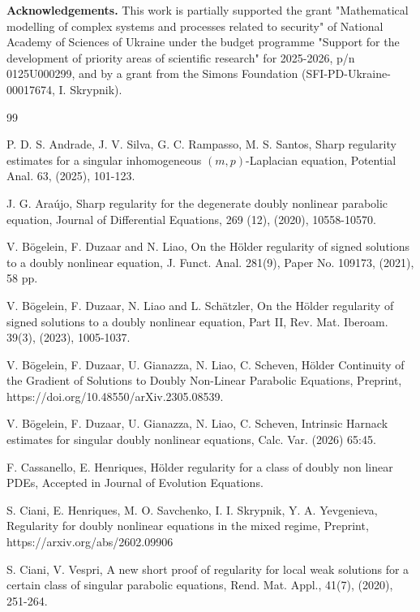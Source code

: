 \documentclass[a4paper,11pt,fullpage]{article}
\numberwithin{equation}{section}
\begin{document}
\vskip3.5mm
{\bf Acknowledgements.} This work is partially supported  the grant "Mathematical modelling of complex systems and processes related to security" of National Academy of Sciences of Ukraine under the budget programme "Support for the development of priority areas of scientific research" for 2025-2026, p/n 0125U000299, and by a grant from the Simons Foundation (SFI-PD-Ukraine-00017674, I. Skrypnik).

\begin{thebibliography}{99}

 P. D. S. Andrade, J. V. Silva, G. C. Rampasso, M. S. Santos, Sharp regularity estimates
for a singular inhomogeneous $(m, p)$-Laplacian equation, Potential Anal. 63, (2025), 101-123.

J. G. Ara\'ujo, Sharp regularity for the degenerate doubly nonlinear parabolic equation,
Journal of Differential Equations, 269 (12), (2020), 10558-10570.

V. B\"{o}gelein, F. Duzaar and N. Liao, On the H\"{o}lder regularity of signed solutions to a doubly nonlinear
 equation, J. Funct. Anal. 281(9), Paper No. 109173, (2021), 58 pp.
 
V. B\"{o}gelein, F. Duzaar, N. Liao and L. Sch\"{a}tzler, On the H\"{o}lder regularity of signed solutions to a doubly
 nonlinear equation, Part II, Rev. Mat. Iberoam. 39(3), (2023), 1005-1037.


V. B\"{o}gelein, F. Duzaar, U. Gianazza, N. Liao, C. Scheven, H\"{o}lder Continuity
 of the Gradient of Solutions to Doubly Non-Linear Parabolic Equations, Preprint,
 https://doi.org/10.48550/arXiv.2305.08539.
 
V. B\"{o}gelein, F. Duzaar, U. Gianazza, N. Liao, C. Scheven, Intrinsic Harnack estimates
for singular doubly nonlinear equations, Calc. Var. (2026) 65:45. 

 F. Cassanello, E. Henriques, H\"{o}lder regularity for a class of doubly non linear PDEs,
Accepted  in Journal of Evolution Equations.

S. Ciani, E. Henriques, M. O. Savchenko, I. I. Skrypnik, Y. A. Yevgenieva,
Regularity for doubly nonlinear equations in the mixed regime, Preprint, https://arxiv.org/abs/2602.09906

S. Ciani, V. Vespri, A new short proof of regularity for local weak solutions
 for a certain class of singular parabolic equations, Rend. Mat. Appl., 41(7),  (2020), 251-264.


\end{thebibliography}
\end{document}
